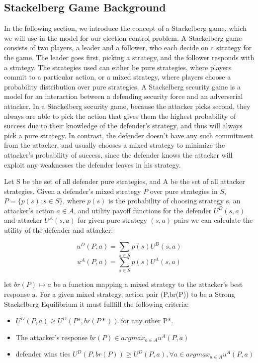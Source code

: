 \documentclass[letterpaper]{article} %
\begin{document}
\subsection{Stackelberg Game Background}
In the following section, we introduce the concept of a Stackelberg game, which we will use in the model for our election control problem. A Stackelberg game consists of two players, a leader and a follower, who each decide on a strategy for the game. The leader goes first, picking a strategy, and the follower responds with a strategy. The strategies used can either be pure strategies, where players commit to a particular action, or a mixed strategy, where players choose a probability distribution over pure strategies. A Stackelberg security game is a model for an interaction between a defending security force and an adverserial attacker. In a Stackelberg security game, because the attacker picks second, they always are able to pick the action that gives them the highest probability of success due to their knowledge of the defender's strategy, and thus will always pick a pure strategy. In contrast, the defender doesn't have any such commitment from the attacker, and usually chooses a mixed strategy to minimize the attacker's probability of success, since the defender knows the attacker will exploit any weaknesses the defender leaves in his strategy. 

Let S be the set of all defender pure strategies, and A be the set of all attacker strategies. Given a defender's mixed strategy $P$ over pure strategies in $S$, $P = \{p(s) : s \in S\}$, where $p(s)$ is the probability of choosing strategy s, an attacker's action $a \in A$, and utility payoff functions for the defender $U^D(s,a)$ and attacker $U^A(s,a)$ for given pure strategy $(s,a)$ pairs we can calculate the utility of the defender and attacker:

\begin{equation}
u^D(P,a) = \sum_{s \in S}p(s)U^D(s,a)
\end{equation}
\begin{equation}
u^A(P,a) = \sum_{s \in S}p(s)U^A(s,a)
\end{equation}

let $br(P) \mapsto a$ be a function mapping a mixed strategy to the attacker's best response a. For a given mixed strategy, action pair (P,br(P)) to be a Strong Stackelberg Equilibrium it must fullfill the following criteria: 

\begin{itemize}
\item $U^D(P,a) \geq U^D(P*,br(P*))$ for any other P*.
\item The attacker's response $br(P) \in argmax_{a \in A}u^A(P,a)$
\item defender wins ties $U^D(P,br(P)) \geq U^D(P,a), \forall a \in argmax_{a \in A}u^A(P,a)$
\end{itemize}
\end{document}
